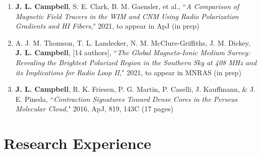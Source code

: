 \documentclass[10pt]{res} %
\begin{document}
\begin{resume}
\begin{enumerate}
\itemsep-1em 
	\item \textbf{J. L. Campbell}, S. E. Clark, B. M. Gaensler, et al., ``\textit{A Comparison of Magnetic Field Tracers in the WIM and CNM Using Radio Polarization Gradients and HI Fibers,}" 2021, to appear in ApJ (in prep) \\
	\item A. J. M. Thomson, T. L. Landecker, N. M. McClure-Griffiths, J. M. Dickey, \textbf{J. L. Campbell}, [14 authors], ``\textit{The Global Magneto-Ionic Medium Survey: Revealing the Brightest Polarized Region in the Southern Sky at 408 MHz and its Implications for Radio Loop II,}" 2021, to appear in MNRAS (in prep) \\
	\item \textbf{J. L. Campbell}, R. K. Friesen, P. G. Martin, P. Caselli, J. Kauffmann, \& J. E. Pineda, ``\textit{Contraction Signatures Toward Dense Cores in the Perseus Molecular Cloud,}" 2016, ApJ, 819, 143C (17 pages)
\end{enumerate}
\newpage
\section{\Large Research Experience}
\vspace{-5pt} %
\noindent\makebox[\linewidth]{\rule{\textwidth}{0.4pt}}
\vspace{-20pt} %


\end{resume}
\end{document}
